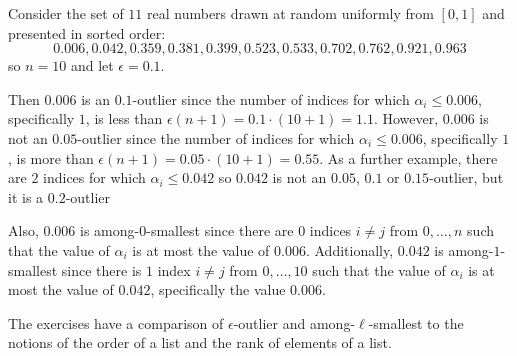 \documentclass[12pt]{article}
\begin{document}
\begin{example}
    Consider the set of \( 11 \) real numbers drawn at random uniformly
    from \( [0,1] \) and presented in sorted order:
    \[
        0.006, 0.042, 0.359, 0.381, 0.399, 0.523, 0.533, 0.702, 0.762, 0.921,
        0.963
      \] so \( n = 10 \) and let \( \epsilon = 0.1 \).

    Then \( 0.006 \)
    is an \( 0.1 \)-outlier since the number of indices for which \(
    \alpha_i \le 0.006 \), specifically \( 1 \), is less than \(
    \epsilon(n+1) = 0.1\cdot (10 +1) = 1.1 \).
    However, \( 0.006 \)
    is not an \( 0.05 \)-outlier since the number of indices for which \(
    \alpha_i \le 0.006 \), specifically \( 1 \), is more than \(
    \epsilon(n+1) = 0.05 \cdot (10 +1) = 0.55 \).  As a further
    example, there are \( 2 \) indices for which \( \alpha_i \le 0.042
    \) so \( 0.042 \) is not an \( 0.05 \), \( 0.1 \) or
    \(0.15 \)-outlier, but it is a \( 0.2 \)-outlier 

    Also, \( 0.006 \) is among-\( 0 \)-smallest since there are \( 0 \)
    indices \( i \ne j \) from \( 0, \dots, n \) such that the value of \(
    \alpha_i \) is at most the value of \( 0.006 \).  Additionally, \(
    0.042 \) is among-\( 1 \)-smallest since there is \( 1 \) index \( i
    \ne j \) from \( 0, \dots, 10 \) such that the value of \( \alpha_i \)
    is at most the value of \( 0.042 \), specifically the value \( 0.006
    \).

    The exercises have a comparison of \( \epsilon \)-outlier and among-\(
    \ell \)-smallest to the notions of the order of a list and the rank
    of elements of a list.
\end{example}
\end{document}
